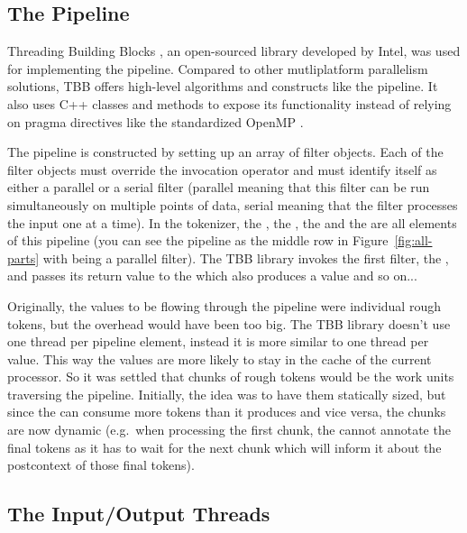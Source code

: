 \subsection{The Pipeline}
\label{ssec:impl-parallel-pipeline}

Threading Building Blocks \cite{web-tbb}, an open-sourced library developed by
Intel, was used for implementing the pipeline. Compared to other mutliplatform
parallelism solutions, TBB offers high-level algorithms and constructs like the
pipeline. It also uses C++ classes and methods to expose its functionality
instead of relying on pragma directives like the standardized OpenMP
\cite{web-openmp}. 

The pipeline is constructed by setting up an array of filter objects. Each of
the filter objects must override the invocation operator and must identify
itself as either a parallel or a serial filter (parallel meaning that this
filter can be run simultaneously on multiple points of data, serial meaning
that the filter processes the input one at a time). In the tokenizer, the
, the , the 
and the  are all elements of this pipeline (you can see
the pipeline as the middle row in Figure~\ref{fig:all-parts} with
 being a parallel filter). The TBB library invokes the
first filter, the , and passes its return value to the
 which also produces a value and so on...

Originally, the values to be flowing through the pipeline were individual rough
tokens, but the overhead would have been too big. The TBB library doesn't use
one thread per pipeline element, instead it is more similar to one thread per
value. This way the values are more likely to stay in the cache of the current
processor. So it was settled that chunks of rough tokens would be the work
units traversing the pipeline. Initially, the idea was to have them statically
sized, but since the  can consume more tokens than it
produces and vice versa, the chunks are now dynamic (e.g.\ when processing the
first chunk, the  cannot annotate the final tokens as it has
to wait for the next chunk which will inform it about the postcontext of those
final tokens).

\subsection{The Input/Output Threads}
\label{ssec:impl-parallel-io}

